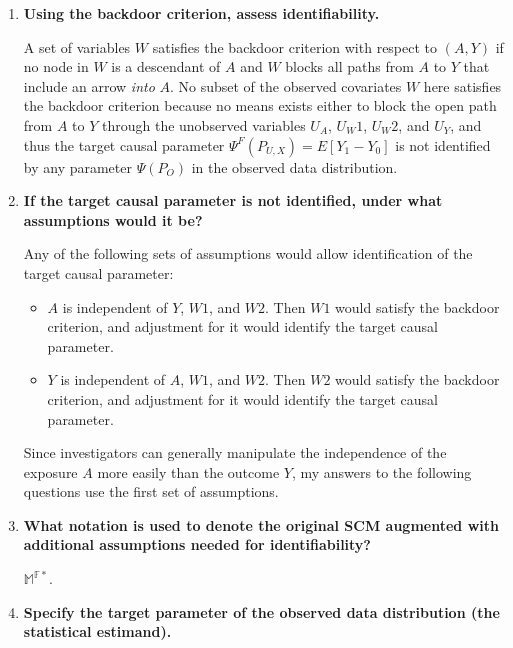 \documentclass{article}\usepackage[]{graphicx}\usepackage[]{xcolor}
\begin{document}
  \begin{enumerate}[label=\textbf{\alph*.}]
  
    \item \textbf{Using the backdoor criterion, assess identifiability.}
    
    A set of variables $W$ satisfies the backdoor criterion with respect to $(A, Y)$ if no node in $W$ is a descendant of $A$ and $W$ blocks all paths from $A$ to $Y$ that include an arrow \textit{into} $A$. No subset of the observed covariates $W$ here satisfies the backdoor criterion because no means exists either to block the open path from $A$ to $Y$ through the unobserved variables $U_A$, $U_W1$, $U_W2$, and $U_Y$, and thus the target causal parameter $\Psi^F(P_{U,X}) = E[Y_1 - Y_0]$ is not identified by any parameter $\Psi(P_O)$ in the observed data distribution.
    
    \item \textbf{If the target causal parameter is not identified, under what assumptions would it be?}
    
    Any of the following sets of assumptions would allow identification of the target causal parameter:
    
    \begin{itemize}
    
      \item $A$ is independent of $Y$, $W1$, and $W2$. Then $W1$ would satisfy the backdoor criterion, and adjustment for it would identify the target causal parameter. 
      
      \item $Y$ is independent of $A$, $W1$, and $W2$. Then $W2$ would satisfy the backdoor criterion, and adjustment for it would identify the target causal parameter. 
    
    \end{itemize}
    
  Since investigators can generally manipulate the independence of the exposure $A$ more easily than the outcome $Y$, my answers to the following questions use the first set of assumptions.
    
    \item \textbf{What notation is used to denote the original SCM augmented with additional assumptions needed for identifiability?}
    
    
    $\mathbb{M}^{\mathbb{F}*}$.
    
    \item \textbf{Specify the target parameter of the observed data distribution (the statistical estimand).}
    

\end{enumerate}
\end{document}
